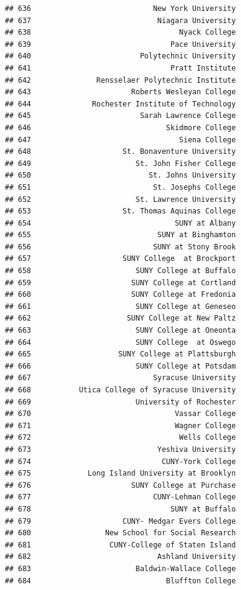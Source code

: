 \documentclass[]{article}
\begin{document}
\begin{verbatim}
## 636                            New York University
## 637                             Niagara University
## 638                                  Nyack College
## 639                                Pace University
## 640                         Polytechnic University
## 641                                Pratt Institute
## 642               Rensselaer Polytechnic Institute
## 643                       Roberts Wesleyan College
## 644              Rochester Institute of Technology
## 645                         Sarah Lawrence College
## 646                               Skidmore College
## 647                                  Siena College
## 648                     St. Bonaventure University
## 649                        St. John Fisher College
## 650                           St. Johns University
## 651                            St. Josephs College
## 652                        St. Lawrence University
## 653                     St. Thomas Aquinas College
## 654                                 SUNY at Albany
## 655                             SUNY at Binghamton
## 656                            SUNY at Stony Brook
## 657                     SUNY College  at Brockport
## 658                        SUNY College at Buffalo
## 659                       SUNY College at Cortland
## 660                       SUNY College at Fredonia
## 661                        SUNY College at Geneseo
## 662                      SUNY College at New Paltz
## 663                        SUNY College at Oneonta
## 664                        SUNY College  at Oswego
## 665                    SUNY College at Plattsburgh
## 666                        SUNY College at Potsdam
## 667                            Syracuse University
## 668           Utica College of Syracuse University
## 669                        University of Rochester
## 670                                 Vassar College
## 671                                 Wagner College
## 672                                  Wells College
## 673                             Yeshiva University
## 674                              CUNY-York College
## 675             Long Island University at Brooklyn
## 676                       SUNY College at Purchase
## 677                            CUNY-Lehman College
## 678                                SUNY at Buffalo
## 679                     CUNY- Medgar Evers College
## 680                 New School for Social Research
## 681                  CUNY-College of Staten Island
## 682                             Ashland University
## 683                        Baldwin-Wallace College
## 684                               Bluffton College

\end{verbatim}
\end{document}
